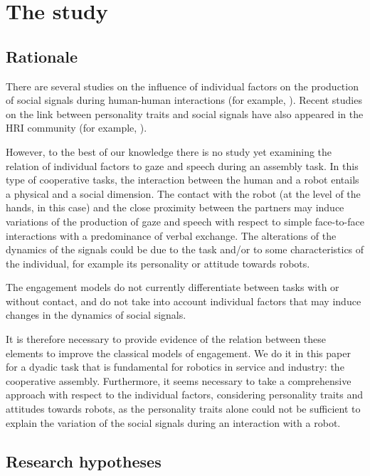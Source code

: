\section{The study}

\subsection{Rationale}

There are several studies on the influence of individual factors on the production of social signals during human-human interactions (for example, \cite{Lepri2010,Vinciarelli14}). 
Recent studies on the link between personality traits and social signals have also appeared in the HRI community (for example, \cite{Tapus08,Aly2013personality}). 

However, to the best of our knowledge there is no study yet examining the relation of individual factors to gaze and speech during an assembly task. 
In this type of cooperative tasks, the interaction between the human and a robot entails a physical and a social dimension. The contact with the robot (at the level of the hands, in this case) and the close proximity between the partners may induce variations of the production of gaze and speech with respect to simple face-to-face interactions with a predominance of verbal exchange. The alterations of the dynamics of the signals could be due to the task and/or to some characteristics of the individual, for example its personality or attitude towards robots.

The engagement models do not currently differentiate between tasks with or without contact, and do not take into account individual factors that may induce changes in the dynamics of social signals.

It is therefore necessary to provide evidence of the relation between these elements to improve the classical models of engagement. We do it in this paper for a dyadic task that is fundamental for robotics in service and industry: the cooperative assembly.
Furthermore, it seems necessary to take a comprehensive approach with respect to the individual factors, considering personality traits and attitudes towards robots, as the personality traits alone could not be sufficient to explain the variation of the social signals during an interaction with a robot.



\subsection{Research hypotheses}\label{sec:hypotheses}

